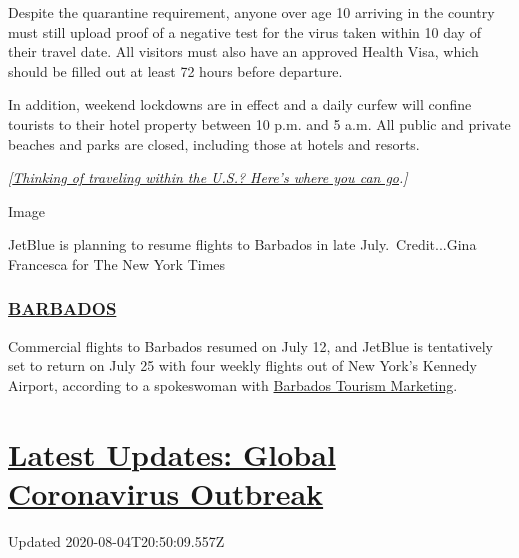 Despite the quarantine requirement, anyone over age 10 arriving in the
country must still upload proof of a negative test for the virus taken
within 10 day of their travel date. All visitors must also have an
approved Health Visa, which should be filled out at least 72 hours
before departure.

In addition, weekend lockdowns are in effect and a daily curfew will
confine tourists to their hotel property between 10 p.m. and 5 a.m. All
public and private beaches and parks are closed, including those at
hotels and resorts.

\emph{{[}}\href{https://www.nytimes3xbfgragh.onion/2020/07/10/travel/state-travel-restrictions.html}{\emph{Thinking
of traveling within the U.S.? Here's where you can go}}\emph{.{]}}

Image

JetBlue is planning to resume flights to Barbados in late
July.~Credit...Gina Francesca for The New York Times

\hypertarget{barbados}{%
\subsubsection{\texorpdfstring{\href{https://gisbarbados.gov.bb/blog/commercial-air-traffic-resumes-july-12-with-protocols/}{BARBADOS}}{BARBADOS}}\label{barbados}}

Commercial flights to Barbados resumed on July 12, and JetBlue is
tentatively set to return on July 25 with four weekly flights out of New
York's Kennedy Airport, according to a spokeswoman with
\href{https://www.visitbarbados.org}{Barbados Tourism Marketing}.

\hypertarget{latest-updates-global-coronavirus-outbreak}{%
\section{\texorpdfstring{\href{https://www.nytimes3xbfgragh.onion/2020/08/04/world/coronavirus-cases.html?action=click\&pgtype=Article\&state=default\&region=MAIN_CONTENT_1\&context=storylines_live_updates}{Latest
Updates: Global Coronavirus
Outbreak}}{Latest Updates: Global Coronavirus Outbreak}}\label{latest-updates-global-coronavirus-outbreak}}

Updated 2020-08-04T20:50:09.557Z

